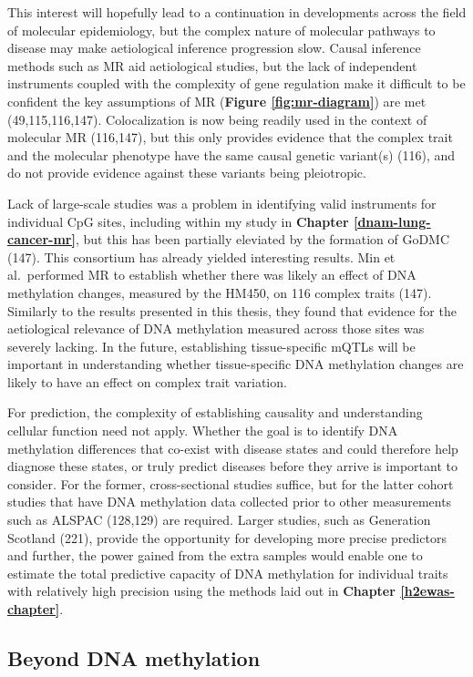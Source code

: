 \documentclass[11pt,oneside]{bristolthesis}
\begin{document}
This interest will hopefully lead to a continuation in developments across the field of molecular epidemiology, but the complex nature of molecular pathways to disease may make aetiological inference progression slow. Causal inference methods such as MR aid aetiological studies, but the lack of independent instruments coupled with the complexity of gene regulation make it difficult to be confident the key assumptions of MR (\textbf{Figure \ref{fig:mr-diagram}}) are met (49,115,116,147). Colocalization is now being readily used in the context of molecular MR (116,147), but this only provides evidence that the complex trait and the molecular phenotype have the same causal genetic variant(s) (116), and do not provide evidence against these variants being pleiotropic.

Lack of large-scale studies was a problem in identifying valid instruments for individual CpG sites, including within my study in \textbf{Chapter \ref{dnam-lung-cancer-mr}}, but this has been partially eleviated by the formation of GoDMC (147). This consortium has already yielded interesting results. Min et al.~performed MR to establish whether there was likely an effect of DNA methylation changes, measured by the HM450, on 116 complex traits (147). Similarly to the results presented in this thesis, they found that evidence for the aetiological relevance of DNA methylation measured across those sites was severely lacking. In the future, establishing tissue-specific mQTLs will be important in understanding whether tissue-specific DNA methylation changes are likely to have an effect on complex trait variation.

For prediction, the complexity of establishing causality and understanding cellular function need not apply. Whether the goal is to identify DNA methylation differences that co-exist with disease states and could therefore help diagnose these states, or truly predict diseases before they arrive is important to consider. For the former, cross-sectional studies suffice, but for the latter cohort studies that have DNA methylation data collected prior to other measurements such as ALSPAC (128,129) are required. Larger studies, such as Generation Scotland (221), provide the opportunity for developing more precise predictors and further, the power gained from the extra samples would enable one to estimate the total predictive capacity of DNA methylation for individual traits with relatively high precision using the methods laid out in \textbf{Chapter \ref{h2ewas-chapter}}.

\hypertarget{beyond-dnam}{%
\subsection{Beyond DNA methylation}\label{beyond-dnam}}
\end{document}
